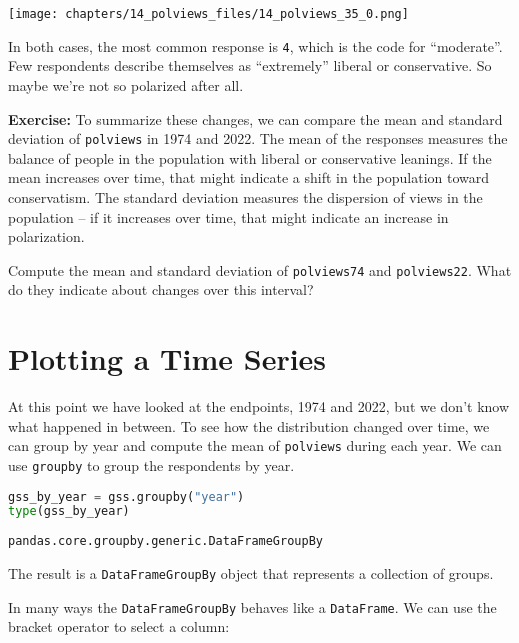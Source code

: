 \begin{center}
\texttt{[image: chapters/14\_polviews\_files/14\_polviews\_35\_0.png]}
\end{center}

In both cases, the most common response is \passthrough{\lstinline!4!},
which is the code for ``moderate''. Few respondents describe themselves
as ``extremely'' liberal or conservative. So maybe we're not so
polarized after all.

\textbf{Exercise:} To summarize these changes, we can compare the mean
and standard deviation of \passthrough{\lstinline!polviews!} in 1974 and
2022. The mean of the responses measures the balance of people in the
population with liberal or conservative leanings. If the mean increases
over time, that might indicate a shift in the population toward
conservatism. The standard deviation measures the dispersion of views in
the population -- if it increases over time, that might indicate an
increase in polarization.

Compute the mean and standard deviation of
\passthrough{\lstinline!polviews74!} and
\passthrough{\lstinline!polviews22!}. What do they indicate about
changes over this interval?

\section{Plotting a Time Series}\label{plotting-a-time-series}

At this point we have looked at the endpoints, 1974 and 2022, but we
don't know what happened in between. To see how the distribution changed
over time, we can group by year and compute the mean of
\passthrough{\lstinline!polviews!} during each year. We can use
\passthrough{\lstinline!groupby!} to group the respondents by year.

\begin{lstlisting}[language=Python,style=source]
gss_by_year = gss.groupby("year")
type(gss_by_year)
\end{lstlisting}

\begin{lstlisting}[style=output]
pandas.core.groupby.generic.DataFrameGroupBy
\end{lstlisting}

The result is a \passthrough{\lstinline!DataFrameGroupBy!} object that
represents a collection of groups.

In many ways the \passthrough{\lstinline!DataFrameGroupBy!} behaves like
a \passthrough{\lstinline!DataFrame!}. We can use the bracket operator
to select a column:

